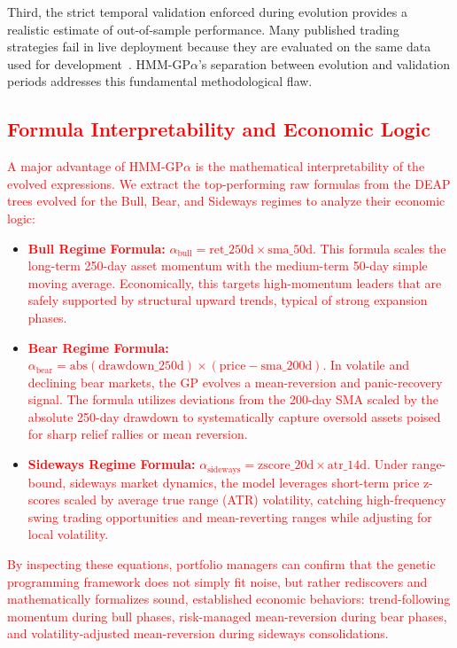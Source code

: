 \documentclass{ieeeaccess}
\newcommand{\revised}[1]{\textcolor{red}{#1}}
\begin{document}
Third, the strict temporal validation enforced during evolution provides a realistic estimate of out-of-sample performance. Many published trading strategies fail in live deployment because they are evaluated on the same data used for development~\cite{b22}. HMM-GP$\alpha$'s separation between evolution and validation periods addresses this fundamental methodological flaw.

\subsection{\revised{Formula Interpretability and Economic Logic}}
\label{sec:interpretability}
\revised{A major advantage of HMM-GP$\alpha$ is the mathematical interpretability of the evolved expressions. We extract the top-performing raw formulas from the DEAP trees evolved for the Bull, Bear, and Sideways regimes to analyze their economic logic:}

\begin{itemize}
    \item \revised{\textbf{Bull Regime Formula:} $\alpha_{\text{bull}} = \text{ret\_250d} \times \text{sma\_50d}$. This formula scales the long-term 250-day asset momentum with the medium-term 50-day simple moving average. Economically, this targets high-momentum leaders that are safely supported by structural upward trends, typical of strong expansion phases.}
    \item \revised{\textbf{Bear Regime Formula:} $\alpha_{\text{bear}} = \text{abs}(\text{drawdown\_250d}) \times (\text{price} - \text{sma\_200d})$. In volatile and declining bear markets, the GP evolves a mean-reversion and panic-recovery signal. The formula utilizes deviations from the 200-day SMA scaled by the absolute 250-day drawdown to systematically capture oversold assets poised for sharp relief rallies or mean reversion.}
    \item \revised{\textbf{Sideways Regime Formula:} $\alpha_{\text{sideways}} = \text{zscore\_20d} \times \text{atr\_14d}$. Under range-bound, sideways market dynamics, the model leverages short-term price z-scores scaled by average true range (ATR) volatility, catching high-frequency swing trading opportunities and mean-reverting ranges while adjusting for local volatility.}
\end{itemize}

\revised{By inspecting these equations, portfolio managers can confirm that the genetic programming framework does not simply fit noise, but rather rediscovers and mathematically formalizes sound, established economic behaviors: trend-following momentum during bull phases, risk-managed mean-reversion during bear phases, and volatility-adjusted mean-reversion during sideways consolidations.}
\end{document}
